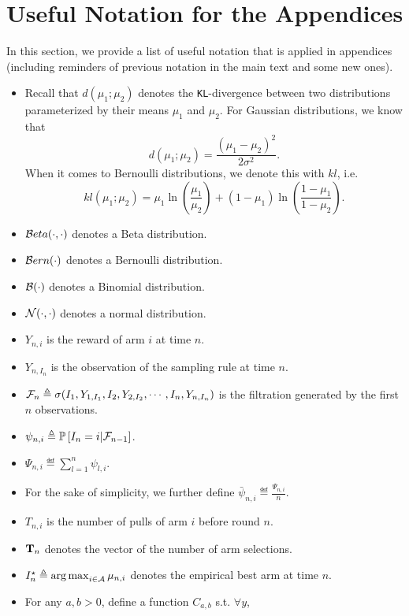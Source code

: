 \section{Useful Notation for the Appendices}\label{app:notation}

In this section, we provide a list of useful notation that is applied in appendices (including reminders of previous notation in the main text and some new ones).

\begin{itemize}
    \item Recall that $d(\mu_1;\mu_2)$ denotes the \texttt{KL}-divergence between two distributions parameterized by their means $\mu_1$ and $\mu_2$. For Gaussian distributions, we know that
    \[
        d(\mu_1;\mu_2) = \frac{(\mu_1-\mu_2)^2}{2\sigma^2}.
    \]
    When it comes to Bernoulli distributions, we denote this with $kl$, i.e.\
    \[
        kl(\mu_1;\mu_2) = \mu_1 \ln \left( \frac{\mu_1}{\mu_2} \right) + (1-\mu_1) \ln  \left( \frac{1-\mu_1}{1-\mu_2} \right).
    \]
    \item $\mathcal{B} eta(\cdot,\cdot)$ denotes a Beta distribution.
    \item $\mathcal{B} ern(\cdot)$ denotes a Bernoulli distribution.
    \item $\mathcal{B}(\cdot)$ denotes a Binomial distribution.
    \item $\mathcal{N}(\cdot,\cdot)$ denotes a normal distribution.
    \item $Y_{n,i}$ is the reward of arm $i$ at time $n$.
    \item $Y_{n,I_n}$ is the observation of the sampling rule at time $n$.
    \item $\mathcal{F}_n \triangleq \sigma(I_1,Y_{1,I_1}, I_2, Y_{2,I_2}, \cdots, I_n, Y_{n,I_n})$ is the filtration generated by the first $n$ observations.
    \item $\psi_{n,i} \triangleq \mathbb{P}\left[I_n = i | \mathcal{F}_{n-1}\right]$.
    \item $\Psi_{n,i} \eqdef \sum_{l=1}^n \psi_{l,i}$.
    \item For the sake of simplicity, we further define $\bar{\psi}_{n,i} \eqdef \frac{\Psi_{n,i}}{n}$.
    \item $T_{n,i}$ is the number of pulls of arm $i$ before round $n$.
    \item ${\bf T}_n$ denotes the vector of the number of arm selections. 
    \item $I_n^\star \triangleq \operatorname*{arg\,max}_{i\in\mathcal{A}} \mu_{n,i}$ denotes the empirical best arm at time $n$.
    \item For any $a, b > 0$, define a function $C_{a,b}$ s.t. $\forall y$,

\end{itemize}
